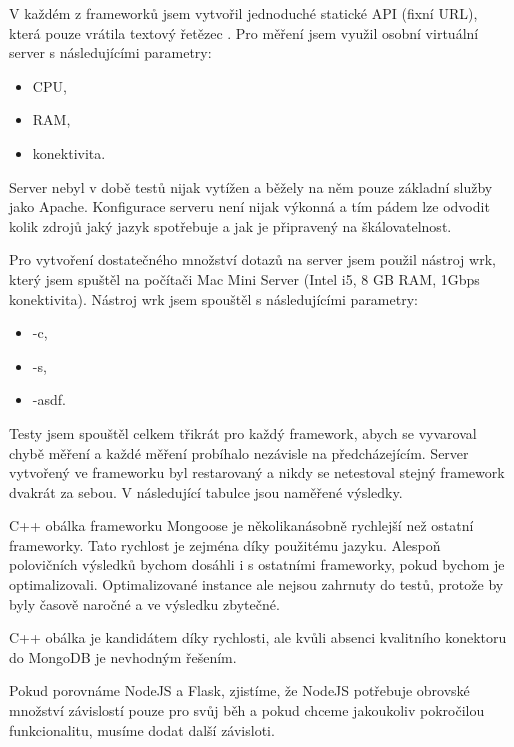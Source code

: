 V každém z frameworků jsem vytvořil jednoduché statické API (fixní URL), která pouze vrátila textový řetězec . Pro měření jsem využil osobní virtuální server s následujícími parametry:

\begin{itemize}
    \item CPU,
    \item RAM,
    \item konektivita.
\end{itemize}

Server nebyl v době testů nijak vytížen a běžely na něm pouze základní služby jako Apache. Konfigurace serveru není nijak výkonná a tím pádem lze odvodit kolik zdrojů jaký jazyk spotřebuje a jak je připravený na škálovatelnost.

Pro vytvoření dostatečného množství dotazů na server jsem použil nástroj wrk, který jsem spuštěl na počítači Mac Mini Server (Intel i5, 8 GB RAM, 1Gbps konektivita). Nástroj wrk jsem spouštěl s následujícími parametry:

\begin{itemize}
    \item -c,
    \item -s,
    \item -asdf.
\end{itemize}

Testy jsem spouštěl celkem třikrát pro každý framework, abych se vyvaroval chybě měření a každé měření probíhalo nezávisle na předcházejícím. Server vytvořený ve frameworku byl restarovaný a nikdy se netestoval stejný framework dvakrát za sebou. V následující tabulce jsou naměřené výsledky.


C++ obálka frameworku Mongoose je několikanásobně rychlejší než ostatní frameworky. Tato rychlost je zejména díky použitému jazyku. Alespoň polovičních výsledků bychom dosáhli i s ostatními frameworky, pokud bychom je optimalizovali. Optimalizované instance ale nejsou zahrnuty do testů, protože by byly časově naročné a ve výsledku zbytečné.

C++ obálka je kandidátem díky rychlosti, ale kvůli absenci kvalitního konektoru do MongoDB je nevhodným řešením. 

Pokud porovnáme NodeJS a Flask, zjistíme, že NodeJS potřebuje obrovské množství závislostí pouze pro svůj běh a pokud chceme jakoukoliv pokročilou funkcionalitu, musíme dodat další závisloti.

